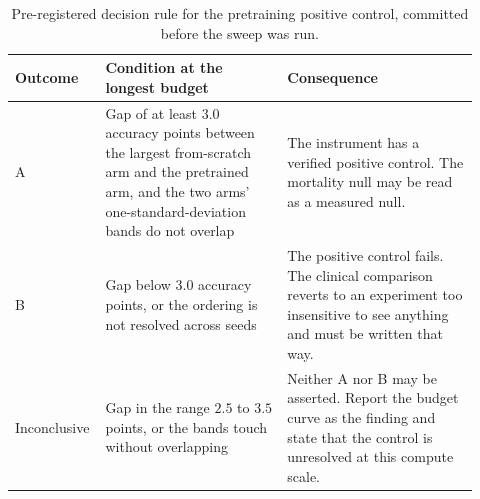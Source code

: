 \begin{table}[H]
\caption[Pre-registered decision rule for the control]{Pre-registered decision rule for the pretraining positive control, committed before the
sweep was run.}
\label{tab:m-prereg}
\centering
\small
\begin{tabular}{p{0.14\linewidth}p{0.38\linewidth}p{0.40\linewidth}}
\toprule
\textbf{Outcome} & \textbf{Condition at the longest budget} & \textbf{Consequence} \\
\midrule
A & Gap of at least $3.0$ accuracy points between the largest from-scratch arm and the pretrained
    arm, and the two arms' one-standard-deviation bands do not overlap
  & The instrument has a verified positive control. The mortality null may be read as a measured
    null. \\
\addlinespace
B & Gap below $3.0$ accuracy points, or the ordering is not resolved across seeds
  & The positive control fails. The clinical comparison reverts to an experiment too insensitive to
    see anything and must be written that way. \\
\addlinespace
Inconclusive & Gap in the range $2.5$ to $3.5$ points, or the bands touch without overlapping
  & Neither A nor B may be asserted. Report the budget curve as the finding and state that the
    control is unresolved at this compute scale. \\
\bottomrule
\end{tabular}
\end{table}
